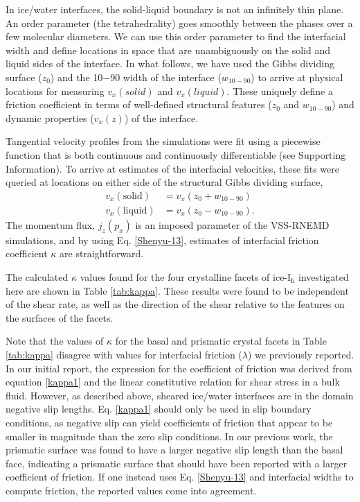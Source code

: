 \documentclass[journal = jpccck, manuscript = article]{achemso}
\begin{document}
In ice/water interfaces, the solid-liquid boundary is not
an infinitely thin plane. An order parameter (the tetrahedrality) goes
smoothly between the phases over a few molecular diameters.  We can
use this order parameter to find the interfacial width and define
locations in space that are unambiguously on the solid and liquid
sides of the interface.  In what follows, we have used the Gibbs
dividing surface ($z_0$) and the 10$-$90 width of the interface
($w_\mathrm{10-90}$) to arrive at physical locations for measuring
$v_{x}(solid)$ and $v_{x}(liquid)$.  These uniquely define a friction
coefficient in terms of well-defined structural features ($z_0$ and
$w_\mathrm{10-90}$) and dynamic properties ($v_{x}(z)$) of the
interface.

Tangential velocity profiles from the simulations were fit using a
piecewise function that is both continuous and continuously
differentiable (see Supporting Information). To arrive at estimates of
the interfacial velocities, these fits were queried at locations on
either side of the structural Gibbs dividing surface,
\begin{align*}
v_{x}(\mathrm{solid}) & = v_{x}( z_0 + w_\mathrm{10-90}) \\
v_{x}(\mathrm{liquid}) & = v_{x}( z_0 - w_\mathrm{10-90}).
\end{align*}
The momentum flux, $j_{z}(p_{x})$ is an imposed parameter of the
VSS-RNEMD simulations, and by using Eq. \eqref{Shenyu-13}, estimates
of interfacial friction coefficient $\kappa$ are straightforward.

The calculated $\kappa$ values found for the four crystalline facets
of ice-I$_\mathrm{h}$ investigated here are shown in Table
\ref{tab:kappa}.  These results were found to be independent of the
shear rate, as well as the direction of the shear relative to the
features on the surfaces of the facets.

Note that the values of $\kappa$ for the basal and prismatic crystal
facets in Table \ref{tab:kappa} disagree with values for interfacial
friction ($\lambda$) we previously reported.\cite{Louden2013} In our
initial report, the expression for the coefficient of friction was
derived from equation \eqref{kappa1} and the linear constitutive
relation for shear stress in a bulk fluid.  However, as described
above, sheared ice/water interfaces are in the domain negative slip
lengths. Eq. \eqref{kappa1} should only be used in slip boundary
conditions, as negative slip can yield coefficients of friction that
appear to be smaller in magnitude than the zero slip conditions. In
our previous work, the prismatic surface was found to have a larger
negative slip length than the basal face, indicating a prismatic
surface that should have been reported with a larger coefficient of
friction. If one instead uses Eq. \eqref{Shenyu-13} and interfacial
widths to compute friction, the reported values come into agreement.
\end{document}
